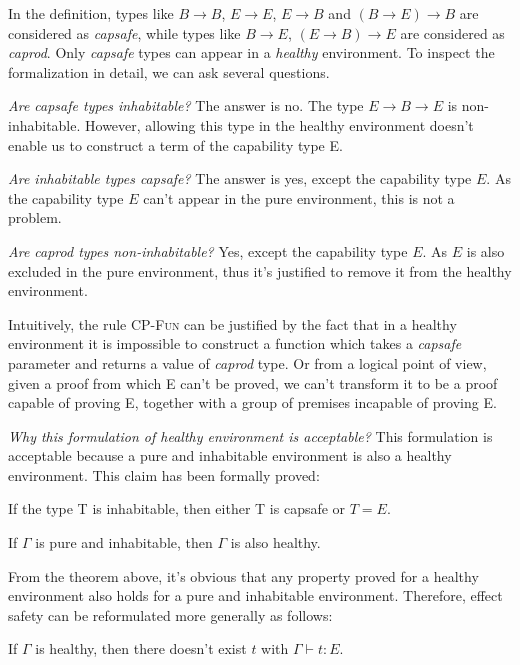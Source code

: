 In the definition, types like $B \to B$, $E \to E$, $E \to B$ and
$(B \to E) \to B$ are considered as \emph{capsafe}, while types like
$B \to E$, $(E \to B) \to E$ are considered as \emph{caprod}. Only
\emph{capsafe} types can appear in a \emph{healthy} environment. To
inspect the formalization in detail, we can ask several questions.

\emph{Are capsafe types inhabitable?} The answer is no. The type
$E \to B \to E$ is non-inhabitable. However, allowing this type in the
healthy environment doesn't enable us to construct a term of the
capability type E.

\emph{Are inhabitable types capsafe?} The answer is yes, except the
capability type $E$. As the capability type $E$ can't appear in the
pure environment, this is not a problem.

\emph{Are caprod types non-inhabitable?} Yes, except the capability
type $E$. As $E$ is also excluded in the pure environment, thus it's
justified to remove it from the healthy environment.

Intuitively, the rule \textsc{CP-Fun} can be justified by the fact
that in a healthy environment it is impossible to construct a function
which takes a \emph{capsafe} parameter and returns a value of
\emph{caprod} type. Or from a logical point of view, given a proof
from which E can't be proved, we can't transform it to be a proof
capable of proving E, together with a group of premises incapable of
proving E.

\emph{Why this formulation of healthy environment is acceptable?} This
formulation is acceptable because a pure and inhabitable environment
is also a healthy environment. This claim has been formally proved:

\begin{lemma}
  If the type T is inhabitable, then either T is capsafe or $T = E$.
\end{lemma}

\begin{theorem}
  If $\Gamma$ is pure and inhabitable, then $\Gamma$ is also healthy.
\end{theorem}

From the theorem above, it's obvious that any property proved for a
healthy environment also holds for a pure and inhabitable
environment. Therefore, effect safety can be reformulated more
generally as follows:

\begin{definition}
  If $\Gamma$ is healthy, then there doesn't exist $t$ with
  $\Gamma \vdash t : E$.
\end{definition}

